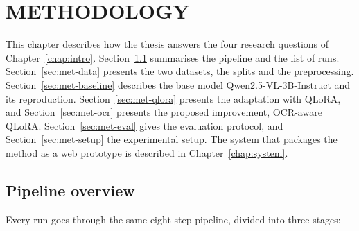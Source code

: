 
\chapter{METHODOLOGY}
\label{chap:methods}

\ifpdf
    \graphicspath{{Chapter4/Figs/Raster/}{Chapter4/Figs/PDF/}{Chapter4/Figs/}}
\else
    \graphicspath{{Chapter4/Figs/Vector/}{Chapter4/Figs/}}
\fi


This chapter describes how the thesis answers the four research questions of
Chapter~\ref{chap:intro}. Section~\ref{sec:met-overview} summarises the pipeline and
the list of runs. Section~\ref{sec:met-data} presents the two datasets, the splits and
the preprocessing. Section~\ref{sec:met-baseline} describes the base model
Qwen2.5-VL-3B-Instruct and its reproduction. Section~\ref{sec:met-qlora} presents the
adaptation with QLoRA, and Section~\ref{sec:met-ocr} presents the proposed
improvement, OCR-aware QLoRA. Section~\ref{sec:met-eval} gives the evaluation protocol, and
Section~\ref{sec:met-setup} the experimental setup. The system that packages the method as a
web prototype is described in Chapter~\ref{chap:system}.

\section{Pipeline overview}
\label{sec:met-overview}

Every run goes through the same eight-step pipeline, divided into three stages:

